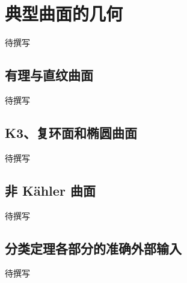 
% 
% 

\section{典型曲面的几何}
\label{g4:sec:3003}

待撰写

\subsection{有理与直纹曲面}
\label{g4:subsec:3003:01}
待撰写

\subsection{K3、复环面和椭圆曲面}
\label{g4:subsec:3003:02}
待撰写

\subsection{非 Kähler 曲面}
\label{g4:subsec:3003:03}
待撰写

\subsection{分类定理各部分的准确外部输入}
\label{g4:subsec:3003:04}
待撰写
